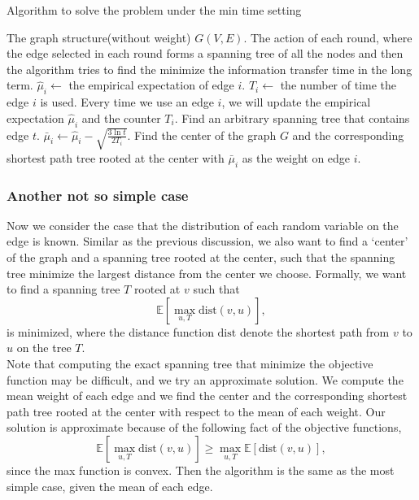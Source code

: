 \documentclass{article}
\theoremstyle{plain}
\theoremstyle{definition}
\theoremstyle{remark}
\begin{document}
    \begin{algorithm}
        \caption{Algorithm to solve the problem under the min time setting}
        \label{cucbcentertree}
        \begin{algorithmic}[1]
        \Require The graph structure(without weight) $G(V,E)$.
        \Ensure The action of each round, where the edge selected in each round forms a spanning tree of all the nodes and then the algorithm tries to find the minimize the information transfer time in the long term.
            \State $\hat \mu_i \leftarrow$ the empirical expectation of edge $i$.
            \State $T_i \leftarrow$ the number of time the edge $i$ is used.
            \State Every time we use an edge $i$, we will update the empirical expectation $\hat \mu_i$ and the counter $T_i$.
                \State Find an arbitrary spanning tree that contains edge $t$.
            \EndFor
                \State $\bar\mu_i \leftarrow \hat\mu_i - \sqrt{\frac{3\ln t}{2T_i}}$.
                \State Find the center of the graph $G$ and the corresponding shortest path tree rooted at the center with $\bar\mu_i$ as the weight on edge $i$.
            \EndFor
        \EndProcedure
        \end{algorithmic}
    \end{algorithm}


    \subsubsection{Another not so simple case}
    Now we consider the case that the distribution of each random variable on the edge is known. Similar as the previous discussion, we also want to find a `center' of the graph and a spanning tree rooted at the center, such that the spanning tree minimize the largest distance from the center we choose. Formally, we want to find a spanning tree $T$ rooted at $v$ such that
    \[\mathbb E[\max_{u,T}\text{dist}(v,u)],\]
    is minimized, where the distance function $\text{dist}$ denote the shortest path from $v$ to $u$ on the tree $T$.\\

    Note that computing the exact spanning tree that minimize the objective function may be difficult, and we try an approximate solution. We compute the mean weight of each edge and we find the center and the corresponding shortest path tree rooted at the center with respect to the mean of each weight. Our solution is approximate because of the following fact of the objective functions,
    \[\mathbb E[\max_{u,T}\text{dist}(v,u)] \ge \max_{u,T}\mathbb E[\text{dist}(v,u)],\]
    since the max function is convex. Then the algorithm is the same as the most simple case, given the mean of each edge.
\end{document}

